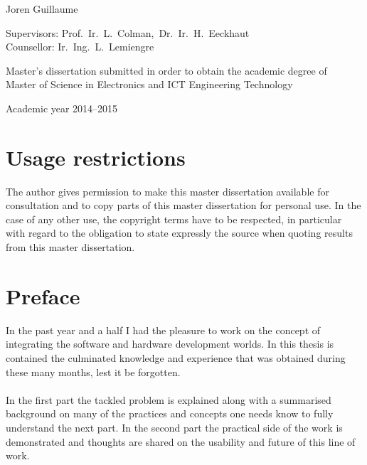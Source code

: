 \documentclass[11pt,british]{article}
\begin{document}
\begin{titlepage}
\begin{center}
\vspace{1.2cm}

Joren Guillaume

\fontsize{12pt}{14pt}
\selectfont

\vspace{3.5cm}

Supervisors: Prof.~Ir.~L.~Colman,~Dr.~Ir.~H.~Eeckhaut\\
Counsellor: Ir.~Ing.~L.~Lemiengre\\

\vspace{2cm}

Master's dissertation submitted in order to obtain the academic degree of\\
Master of Science in Electronics and ICT Engineering Technology

\vspace{1cm}

Academic year 2014--2015

\end{center}
\end{titlepage}


%


\newpage{}
\part*{Usage restrictions}

The author gives permission to make this master dissertation available for consultation 
and to copy parts of this master dissertation for personal use. 
 In the case of any other use, the copyright terms have to be respected, in particular with regard to 
the obligation to state expressly the source when quoting results from this master dissertation.

\pagebreak{}


\newpage{}\part*{Preface}
In the past year and a half I had the pleasure to work on the concept of integrating the software and hardware development worlds. In this thesis is contained the culminated knowledge and experience that was obtained during these many months, lest it be forgotten.
\\
\\
In the first part the tackled problem is explained along with a summarised background on many of the practices and concepts one needs know to fully understand the next part. In the second part the practical side of the work is demonstrated and thoughts are shared on the usability and future of this line of work.
\\
\\
\end{document}
